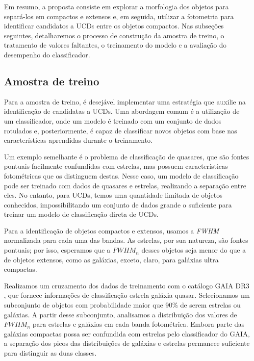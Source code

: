 Em resumo, a proposta consiste em explorar a morfologia dos objetos para separá-los em compactos e extensos e, em seguida, utilizar a fotometria para identificar candidatos a UCDs entre os objetos compactos. Nas subseções seguintes, detalharemos o processo de construção da amostra de treino, o tratamento de valores faltantes, o treinamento do modelo e a avaliação do desempenho do classificador.



\subsection{Amostra de treino}\label{subsec:amostra_treino}
Para a amostra de treino, é desejável implementar uma estratégia que auxilie na identificação de candidatas a UCDs. Uma abordagem comum é a utilização de um classificador, onde um modelo é treinado com um conjunto de dados rotulados e, posteriormente, é capaz de classificar novos objetos com base nas características aprendidas durante o treinamento.

Um exemplo semelhante é o problema de classificação de quasares, que são fontes pontuais facilmente confundidas com estrelas, mas possuem características fotométricas que os distinguem destas. Nesse caso, um modelo de classificação pode ser treinado com dados de quasares e estrelas, realizando a separação entre eles. No entanto, para UCDs, temos uma quantidade limitada de objetos conhecidos, impossibilitando um conjunto de dados grande o suficiente para treinar um modelo de classificação direta de UCDs.

Para a identificação de objetos compactos e extensos, usamos a \textit{FWHM} normalizada para cada uma das bandas. As estrelas, por sua natureza, são fontes pontuais; por isso, esperamos que a $\textit{FWHM}_n$ desses objetos seja menor do que a de objetos extensos, como as galáxias, exceto, claro, para galáxias ultra compactas.

Realizamos um cruzamento dos dados de treinamento com o catálogo GAIA DR3 \citep{GAIA_DR3}, que fornece informações de classificação estrela-galáxia-quasar. Selecionamos um subconjunto de objetos com probabilidade maior que 90\% de serem estrelas ou galáxias. A partir desse subconjunto, analisamos a distribuição dos valores de $\textit{FWHM}_n$ para estrelas e galáxias em cada banda fotométrica. Embora parte das galáxias compactas possa ser confundida com estrelas pelo classificador do GAIA, a separação dos picos das distribuições de galáxias e estrelas permanece suficiente para distinguir as duas classes.

